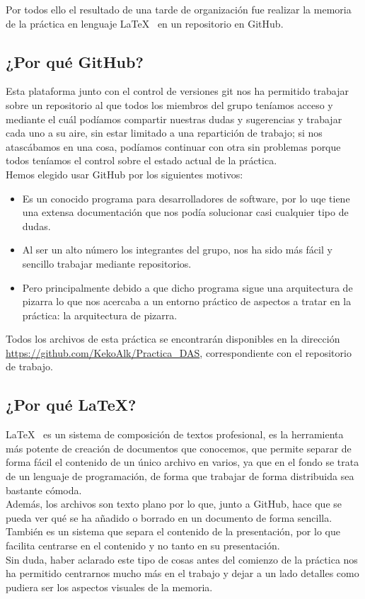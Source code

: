 Por todos ello el resultado de una tarde de organización fue realizar la memoria de la práctica en lenguaje \LaTeX~ en un repositorio en GitHub\cite{repositorio}.

\subsection*{¿Por qué GitHub?}
Esta plataforma junto con el control de versiones git\cite{git} nos ha permitido trabajar sobre un repositorio al que todos los miembros del grupo teníamos acceso y mediante el cuál podíamos compartir nuestras dudas y sugerencias y trabajar cada uno a su aire, sin estar limitado a una repartición de trabajo; si nos atascábamos en una cosa, podíamos continuar con otra sin problemas porque todos teníamos el control sobre el estado actual de la práctica.\\

Hemos elegido usar GitHub por los siguientes motivos:
\begin{itemize}
	\item Es un conocido programa para desarrolladores de software, por lo uqe tiene una extensa documentación que nos podía solucionar casi cualquier tipo de dudas.
	\item Al ser un alto número los integrantes del grupo, nos ha sido más fácil y sencillo trabajar mediante repositorios. 
	\item Pero principalmente debido a que dicho programa sigue una arquitectura de pizarra lo que nos acercaba a un entorno práctico de aspectos a tratar en la práctica: la arquitectura de pizarra.
\end{itemize}

Todos los archivos de esta práctica se encontrarán disponibles en la dirección
\url{https://github.com/KekoAlk/Practica_DAS}, correspondiente con el repositorio de trabajo.

\subsection*{¿Por qué \LaTeX?}
\LaTeX~ es un sistema de composición de textos profesional, es la herramienta más potente de creación de documentos que conocemos, que permite separar de forma fácil el contenido de un único archivo en varios, ya que en el fondo se trata de un lenguaje de programación, de forma que trabajar de forma distribuida sea bastante cómoda.\\

Además, los archivos son texto plano por lo que, junto a GitHub, hace que se pueda ver qué se ha añadido o borrado en un documento de forma sencilla. También es un sistema que separa el contenido de la presentación, por lo que facilita centrarse en el contenido y no tanto en su presentación.\\

Sin duda, haber aclarado este tipo de cosas antes del comienzo de la práctica nos ha permitido centrarnos mucho más en el trabajo y dejar a un lado detalles como pudiera ser los aspectos visuales de la memoria.




